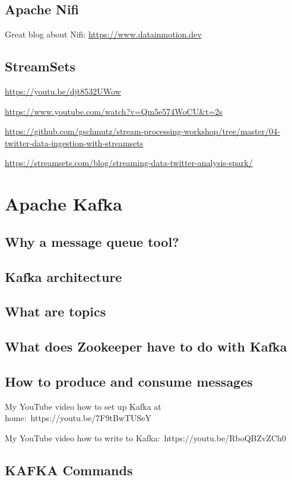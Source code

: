 \documentclass[12pt, numbers=noenddot]{scrreprt} %
\begin{document}
\section{Apache Nifi}
Great blog about Nifi:
\url{https://www.datainmotion.dev}

\section{StreamSets}

\url{https://youtu.be/djt8532UWow}

\url{https://www.youtube.com/watch?v=Qm5e574WoCU&t=2s}

\url{https://github.com/gschmutz/stream-processing-workshop/tree/master/04-twitter-data-ingestion-with-streamsets}

\url{https://streamsets.com/blog/streaming-data-twitter-analysis-spark/}

\chapter{Apache Kafka}

\section{Why a message queue tool?}
\section{Kafka architecture}
\section{What are topics}
\section{What does Zookeeper have to do with Kafka}
\section{How to produce and consume messages}

My YouTube video how to set up Kafka at home: https://youtu.be/7F9tBwTUSeY

My YouTube video how to write to Kafka: https://youtu.be/RboQBZvZCh0

\section{KAFKA Commands}
\end{document}
